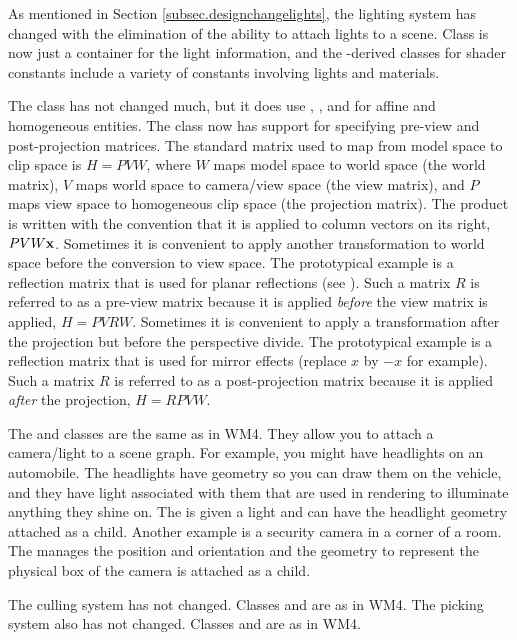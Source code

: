\documentclass{article}
\begin{document}
As mentioned in Section \ref{subsec.designchangelights}, the lighting
system has changed with the elimination of the ability to attach lights
to a scene.  Class  is now just a container for the light
information, and the -derived classes for shader
constants include a variety of constants involving lights and materials.

The  class has not changed much, but it does use ,
, and  for affine and homogeneous entities.  The
class now has support for specifying pre-view and post-projection matrices.
The standard matrix used to map from model space to clip space is $H = PVW$,
where $W$ maps model space to world space (the world matrix), $V$ maps
world space to camera/view space (the view matrix), and $P$ maps view
space to homogeneous clip space (the projection matrix).  The product is
written with the convention that it is applied to column vectors on its
right, $PVW \mbox{\bf x}$.  Sometimes it is convenient to apply another
transformation to world space before the conversion to view space.  The
prototypical example is a reflection matrix that is used for planar
reflections (see ).  Such a matrix $R$ is
referred to as a pre-view matrix because it is applied {\em before} the
view matrix is applied, $H = PVRW$.  Sometimes it is convenient to apply
a transformation after the projection but before the perspective divide.
The prototypical example is a reflection matrix that is used for mirror
effects (replace $x$ by $-x$ for example).  Such a matrix $R$ is referred
to as a post-projection matrix because it is applied {\em after} the
projection, $H = RPVW$.

The  and  classes are the same as in WM4.
They allow you to attach a camera/light to a scene graph.  For example,
you might have headlights on an automobile.  The headlights have geometry
so you can draw them on the vehicle, and they have light associated with
them that are used in rendering to illuminate anything they shine on.
The  is given a light and can have the headlight geometry
attached as a child.  Another example is a security camera in a corner of
a room.  The  manages the  position and
orientation and the geometry to represent the physical box of the camera
is attached as a child.

The culling system has not changed.  Classes  and
 are as in WM4.  The picking system also has not changed.
Classes  and  are as in WM4.
\end{document}
